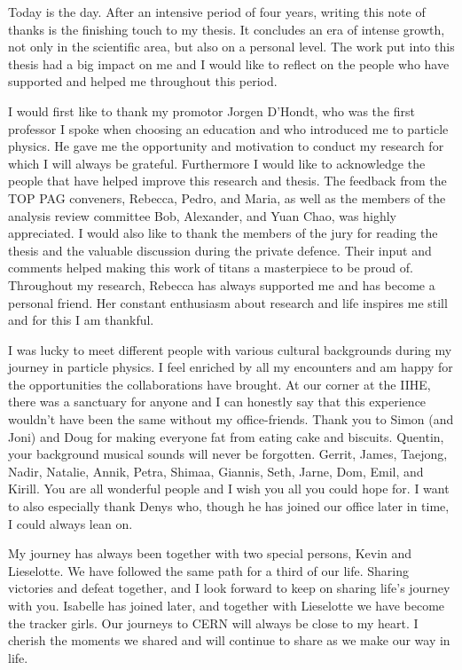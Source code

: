 Today is the day. After an intensive period of four years, writing this note of thanks is the finishing touch to my thesis. It concludes an era of intense growth, not only in the scientific area, but also on a personal level. The work put into this thesis had a big impact on me and I would like to reflect on the people who have supported and helped me throughout this period. 

I would first like to thank my promotor Jorgen D'Hondt, who was the first professor I spoke when choosing an education and who introduced me to particle physics. He gave me the opportunity and motivation to conduct my research for which I will always be grateful. Furthermore I would like to acknowledge the people that have helped improve this research and thesis. The feedback from the TOP PAG conveners, Rebecca, Pedro, and Maria,  as well as the members of the analysis review committee Bob, Alexander, and Yuan Chao, was highly appreciated. I would also like to thank the members of the jury for reading the thesis and the valuable discussion during the private defence. Their input and comments helped making this work of titans a masterpiece to be proud of. Throughout my research, Rebecca  has always supported me and has become a personal friend. Her constant enthusiasm about research and life inspires me still and for this I am thankful. 

I was lucky to meet different people with various cultural backgrounds during my journey in particle physics. I feel enriched by all my encounters and am happy for the opportunities the collaborations have brought. At our corner at the IIHE, there was a sanctuary for anyone and I can honestly say that this experience wouldn't have been the same without my office-friends. Thank you to Simon (and Joni) and Doug for making everyone fat from eating cake and biscuits. Quentin, your background musical sounds will never be forgotten.  Gerrit, James, Taejong, Nadir, Natalie, Annik, Petra, Shimaa, Giannis, Seth, Jarne, Dom, Emil, and Kirill. You are all wonderful people and I wish you all you could hope for. I want to also especially thank Denys who, though he has joined our office later in time, I could always lean on. 

My journey has always been together with two special persons, Kevin and Lieselotte. We have followed the same path for a third of our life. Sharing victories and defeat together, and I look forward to keep on sharing life's journey with you. Isabelle has joined later, and together with Lieselotte we have become the tracker girls. Our journeys to CERN will always be close to my heart. I cherish the moments we shared and will continue to share as we make our way in life. 

